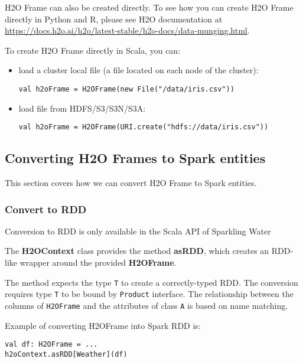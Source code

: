 \documentclass{standalone}
\begin{document}
    H2O Frame can also be created directly. To see how you can create H2O Frame directly in Python and R, please see
    H2O documentation at \url{https://docs.h2o.ai/h2o/latest-stable/h2o-docs/data-munging.html}.

    To create H2O Frame directly in Scala, you can:

    \begin{itemize}
        \item load a cluster local file (a file located on each node of the cluster):
        \begin{lstlisting}[style=Scala]
val h2oFrame = H2OFrame(new File("/data/iris.csv"))
        \end{lstlisting}
        \item load file from HDFS/S3/S3N/S3A:
        \begin{lstlisting}[style=Scala]
val h2oFrame = H2OFrame(URI.create("hdfs://data/iris.csv"))
        \end{lstlisting}
    \end{itemize}

    \subsection{Converting H2O Frames to Spark entities}

    This section covers how we can convert H2O Frame to Spark entities.

    \subsubsection{Convert to RDD}

    Conversion to RDD is only available in the Scala API of Sparkling Water

    The \textbf{H2OContext} class provides the method \textbf{asRDD}, which creates an RDD-like wrapper around the
    provided \textbf{H2OFrame}.

    The method expects the type \texttt{T} to create a correctly-typed RDD. The conversion requires type \texttt{T} to
    be bound by \texttt{Product} interface. The relationship between the columns of \texttt{H2OFrame} and the
    attributes of class \texttt{A} is based on name matching.

    Example of converting H2OFrame into Spark RDD is:

    \begin{lstlisting}[style=Scala]
val df: H2OFrame = ...
h2oContext.asRDD[Weather](df)
    \end{lstlisting}
\end{document}
